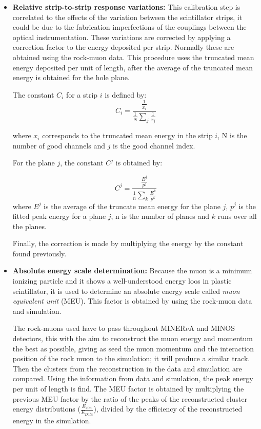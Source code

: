 \begin{itemize}
    \item \textbf{Relative strip-to-strip response variations:} This calibration step is correlated to the effects of the variation between the scintillator strips, it could be due to the fabrication imperfections of the couplings between the optical instrumentation. These variations are corrected by applying a correction factor to the energy deposited per strip. Normally these are obtained using the rock-muon data. 
    This procedure uses the truncated mean energy deposited per unit of length, after the average of the truncated mean energy is obtained for the hole plane. 

    The constant $C_i$\cite{MINERvA} for a strip $i$ is defined by:
    \begin{equation}
        C_i = \frac{\frac{1}{x_i}}{\frac{1}{N}\sum_j\frac{1}{x_j}}
        \label{eq:MnvExp:MnvDetector:Calibration:InSitu:ResponsStripConstant}
    \end{equation}

    where $x_i$ corresponds to the truncated mean energy in the strip $i$, N is the number of good channels and $j$ is the good channel index. 

    For the plane $j$, the constant $C^j$ \cite{MINERvA} is obtained by:

    \begin{equation}
        C^j = \frac{\frac{E^j}{p^j}}{\frac{1}{n}\sum_k\frac{E^k}{p^k}}
        \label{eq:MnvExp:MnvDetector:Calibration:InSitu:ResponsPlaneConstant}
    \end{equation}
    where $E^j$ is the average of the truncate mean energy for the plane $j$, $p^j$ is the fitted peak energy for a plane $j$, n is the number of planes and $k$ runs over all the planes.   
    
    Finally, the correction is made by multiplying the energy by the constant found previously.   
    \item \textbf{Absolute energy scale determination:} Because the muon is a minimum ionizing particle and it shows a well-understood energy loos in plastic scintillator, it is used to determine an absolute energy scale called \textit{muon equivalent unit} (MEU). This factor is obtained by using the rock-muon data and simulation. 

    The rock-muons used have to pass throughout MINER$\nu$A and MINOS detectors, this with the aim to reconstruct the muon energy and momentum the best as possible, giving as seed the muon momentum and the interaction position of the rock muon to the simulation; it will produce a similar track. Then the clusters from the reconstruction in the data and simulation are compared. Using the information from data and simulation, the peak energy per unit of length is find. The MEU factor is obtained by multiplying the previous MEU factor by the ratio of the peaks of the reconstructed cluster energy distributions ($\frac{E_{sim}}{E_{Data}}$), divided by the efficiency of the reconstructed energy in the simulation.


\end{itemize}
